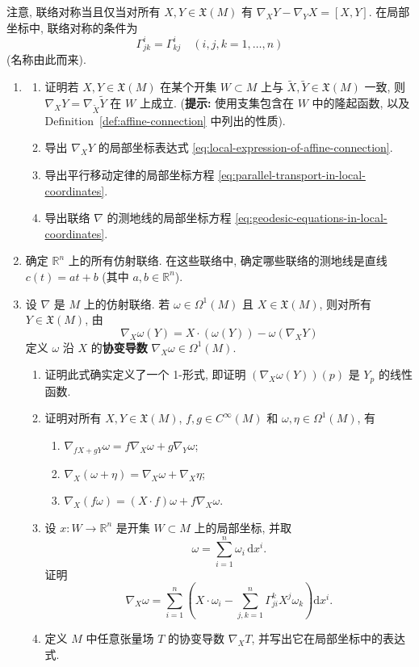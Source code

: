 注意, 联络对称当且仅当对所有 $X,Y\in\mathfrak{X}(M)$ 有 $\nabla_XY-\nabla_YX=[X,Y]$. 在局部坐标中, 联络对称的条件为
\[
  \Gamma_{jk}^i=\Gamma_{kj}^i\quad(i,j,k=1,\ldots,n)
\]
(名称由此而来).

\begin{RiemannExercise}\label{ex:affine-connections}
\begin{enumerate}[label=(\arabic*),ref=\arabic*,leftmargin=*]
\item\label{ex:locality-and-coordinate-expressions}
\begin{enumerate}[label=(\alph*),leftmargin=*]
\item 证明若 $X,Y\in\mathfrak{X}(M)$ 在某个开集 $W\subset M$ 上与 $\widetilde X,\widetilde Y\in\mathfrak{X}(M)$ 一致, 则 $\nabla_XY=\nabla_{\widetilde X}\widetilde Y$ 在 $W$ 上成立.
{\small (\textbf{提示:} 使用支集包含在 $W$ 中的隆起函数, 以及 Definition~\ref{def:affine-connection} 中列出的性质).}
\item 导出 $\nabla_XY$ 的局部坐标表达式 \eqref{eq:local-expression-of-affine-connection}.
\item 导出平行移动定律的局部坐标方程 \eqref{eq:parallel-transport-in-local-coordinates}.
\item 导出联络 $\nabla$ 的测地线的局部坐标方程 \eqref{eq:geodesic-equations-in-local-coordinates}.
\end{enumerate}
\item\label{ex:connections-with-straight-geodesics} 确定 $\mathbb{R}^n$ 上的所有仿射联络. 在这些联络中, 确定哪些联络的测地线是直线 $c(t)=at+b$ (其中 $a,b\in\mathbb{R}^n$).
\item\label{ex:covariant-derivative-of-tensors} 设 $\nabla$ 是 $M$ 上的仿射联络. 若 $\omega\in\Omega^1(M)$ 且 $X\in\mathfrak{X}(M)$, 则对所有 $Y\in\mathfrak{X}(M)$, 由
\[
  \nabla_X\omega(Y)=X\cdot(\omega(Y))-\omega(\nabla_XY)
\]
定义 $\omega$ 沿 $X$ 的\textbf{协变导数} $\nabla_X\omega\in\Omega^1(M)$.
\begin{enumerate}[label=(\alph*),leftmargin=*]
\item 证明此式确实定义了一个 1-形式, 即证明 $(\nabla_X\omega(Y))(p)$ 是 $Y_p$ 的线性函数.
\item 证明对所有 $X,Y\in\mathfrak{X}(M)$, $f,g\in C^\infty(M)$ 和 $\omega,\eta\in\Omega^1(M)$, 有
\begin{enumerate}[label=(\roman*),leftmargin=*]
\item $\nabla_{fX+gY}\omega=f\nabla_X\omega+g\nabla_Y\omega$;
\item $\nabla_X(\omega+\eta)=\nabla_X\omega+\nabla_X\eta$;
\item $\nabla_X(f\omega)=(X\cdot f)\omega+f\nabla_X\omega$.
\end{enumerate}
\item 设 $x:W\to\mathbb{R}^n$ 是开集 $W\subset M$ 上的局部坐标, 并取
\[
  \omega=\sum_{i=1}^n\omega_i\,\mathrm{d}x^i.
\]
证明
\[
  \nabla_X\omega=\sum_{i=1}^n
  \left(X\cdot\omega_i-\sum_{j,k=1}^n\Gamma_{ji}^kX^j\omega_k\right)\mathrm{d}x^i.
\]
\item 定义 $M$ 中任意张量场 $T$ 的协变导数 $\nabla_XT$, 并写出它在局部坐标中的表达式.
\end{enumerate}
\end{enumerate}
\end{RiemannExercise}
